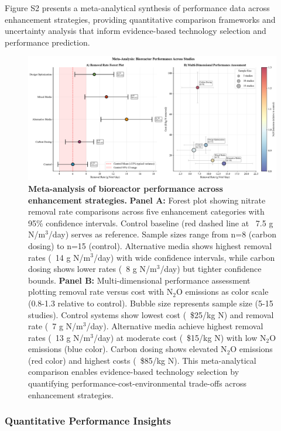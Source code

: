 \documentclass[12pt,a4paper]{article}
\begin{document}
Figure S2 presents a meta-analytical synthesis of performance data across enhancement strategies, providing quantitative comparison frameworks and uncertainty analysis that inform evidence-based technology selection and performance prediction.

\begin{figure}[H]
\centering
\includegraphics[width=1.0\textwidth]{fig_meta_analysis_performance}
\caption{\textbf{Meta-analysis of bioreactor performance across enhancement strategies.}
\textbf{Panel A:} Forest plot showing nitrate removal rate comparisons across five enhancement categories with 95\% confidence intervals. Control baseline (red dashed line at ~7.5 g N/m$^3$/day) serves as reference. Sample sizes range from n=8 (carbon dosing) to n=15 (control). Alternative media shows highest removal rates (~14 g N/m$^3$/day) with wide confidence intervals, while carbon dosing shows lower rates (~8 g N/m$^3$/day) but tighter confidence bounds.
\textbf{Panel B:} Multi-dimensional performance assessment plotting removal rate versus cost with N$_2$O emissions as color scale (0.8-1.3 relative to control). Bubble size represents sample size (5-15 studies). Control systems show lowest cost (~\$25/kg N) and removal rate (~7 g N/m$^3$/day). Alternative media achieve highest removal rates (~13 g N/m$^3$/day) at moderate cost (~\$15/kg N) with low N$_2$O emissions (blue color). Carbon dosing shows elevated N$_2$O emissions (red color) and highest costs (~\$85/kg N).
This meta-analytical comparison enables evidence-based technology selection by quantifying performance-cost-environmental trade-offs across enhancement strategies.}
\label{fig:meta_analysis}
\end{figure}

\subsubsection{Quantitative Performance Insights}
\end{document}
